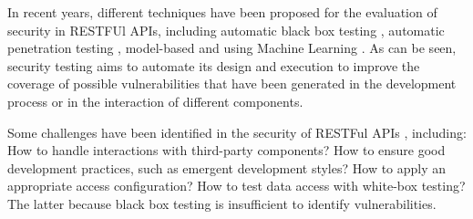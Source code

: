 In recent years, different techniques have been proposed for the evaluation of security in RESTFUl APIs, including automatic black box testing\cite{Corradini2023} , automatic penetration testing\cite{Auricchio2022} , model-based\cite{EMEKA2023} and using Machine Learning\cite{Ghanem2019,Hu2020,Schwartz2019} . As can be seen, security testing aims to automate its design and execution to improve the coverage of possible vulnerabilities that have been generated in the development process or in the interaction of different components.

Some challenges have been identified in the security of RESTFul APIs\cite{zhong2023}
, including: How to handle interactions with third-party components? How to ensure good development practices, such as emergent development styles? How to apply an appropriate access configuration? How to test data access with white-box testing? The latter because black box testing is insufficient to identify vulnerabilities.